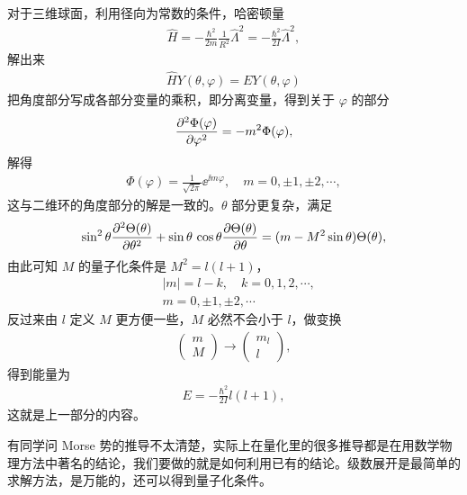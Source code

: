 对于三维球面，利用径向为常数的条件，哈密顿量
\begin{align}
    \hat H = -\frac{\hbar^2}{2m} \frac1{R^2} \hat \Lambda^2 = - \frac{\hbar^2}{2I} \hat \Lambda^2,
\end{align}
解出来
\begin{align}
    \hat H Y(\theta, \varphi) = E Y(\theta, \varphi)
\end{align}
把角度部分写成各部分变量的乘积，即分离变量，得到关于 $\varphi$ 的部分
\begin{align}
    \pdv[2]{\Phi(\varphi)}{\varphi} = - m^2 \Phi(\varphi), 
\end{align}
解得
\begin{align}
    \Phi(\varphi) = \frac1{\sqrt{2\pi}} \ee^{\ii m \varphi}, \quad m = 0,\pm1, \pm2, \cdots,
\end{align}
这与二维环的角度部分的解是一致的。$\theta$ 部分更复杂，满足
\begin{align}
    \sin^2\theta \pdv[2]{\Theta(\theta)}{\theta} + \sin\theta\, \cos\theta \pdv{\Theta(\theta)}{\theta} = (m-M^2 \sin\theta) \Theta(\theta),
\end{align}
由此可知 $M$ 的量子化条件是 $M^2 = l(l+1)$，
\begin{align}
    &|m| = l - k, \quad k = 0,1,2,\cdots,
    \\
    &m = 0, \pm1, \pm2, \cdots
\end{align}
反过来由 $l$ 定义 $M$ 更方便一些，$M$ 必然不会小于 $l$，做变换
\begin{align}
    \begin{pmatrix}
        m \\ M
    \end{pmatrix}
    \rightarrow
    \begin{pmatrix}
        m_l \\ l
    \end{pmatrix},
\end{align}
得到能量为
\begin{align}
    E = - \frac{\hbar^2}{2I} l(l+1),
\end{align}
这就是上一部分的内容。

有同学问 Morse 势的推导不太清楚，实际上在量化里的很多推导都是在用数学物理方法中著名的结论，我们要做的就是如何利用已有的结论。级数展开是最简单的求解方法，是万能的，还可以得到量子化条件。
